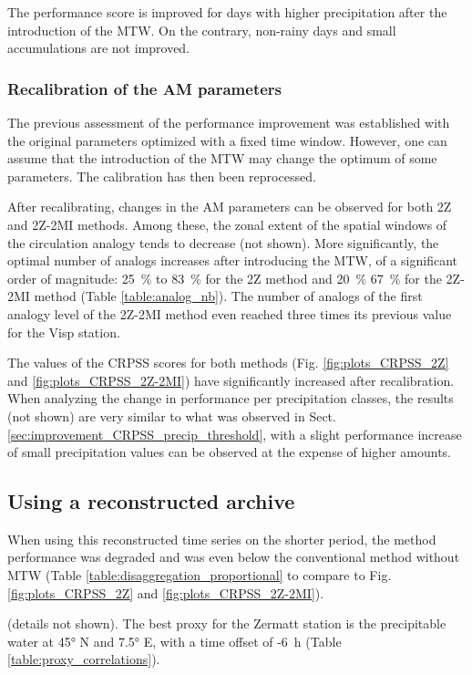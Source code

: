 \documentclass[hess, manuscript]{copernicus}
\begin{document}
The performance score is improved for days with higher precipitation after the introduction of the MTW. On the contrary, non-rainy days and small accumulations are not improved.


\subsubsection{Recalibration of the AM parameters}
\label{sec:recalibration}

The previous assessment of the performance improvement was established with the original parameters optimized with a fixed time window. However, one can assume that the introduction of the MTW may change the optimum of some parameters. The calibration has then been reprocessed.

After recalibrating, changes in the AM parameters can be observed for both 2Z and 2Z-2MI methods. Among these, the zonal extent of the spatial windows of the circulation analogy tends to decrease (not shown). More significantly, the optimal number of analogs increases after introducing the MTW, of a significant order of magnitude: 25~\% to 83~\% for the 2Z method and 20~\% 67~\% for the 2Z-2MI method (Table \ref{table:analog_nb}). The number of analogs of the first analogy level of the 2Z-2MI method even reached three times its previous value for the Visp station. 

The values of the CRPSS scores for both methods (Fig. \ref{fig:plots_CRPSS_2Z} and \ref{fig:plots_CRPSS_2Z-2MI}) have significantly increased after recalibration. When analyzing the change in performance per precipitation classes, the results (not shown) are very similar to what was observed in Sect. \ref{sec:improvement_CRPSS_precip_threshold}, with a slight performance increase of small precipitation values can be observed at the expense of higher amounts.


\subsection{Using a reconstructed archive}

When using this reconstructed time series on the shorter period, the method performance was degraded and was even below the conventional method without MTW (Table \ref{table:disaggregation_proportional} to compare to Fig. \ref{fig:plots_CRPSS_2Z} and \ref{fig:plots_CRPSS_2Z-2MI}).

 (details not shown). The best proxy for the Zermatt station is the precipitable water at 45° N and 7.5° E, with a time offset of -6~h (Table \ref{table:proxy_correlations}).
\end{document}
